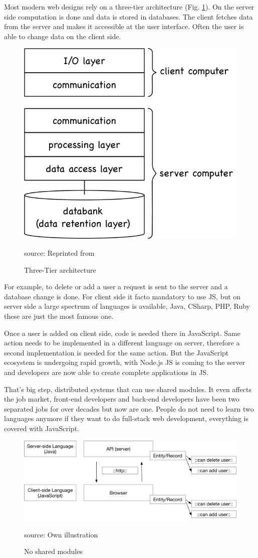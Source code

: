 Most modern web designs rely on a three-tier architecture (Fig. 
\ref{fig:TT}). On the server side computation is done and data 
is stored in databases. The client fetches data from the server and 
makes it accessible at the user interface. Often the user is able 
to change data on the client side. \cite{GOLL}

\begin{figure}[H]
	\centering
	\includegraphics[width=0.5\linewidth]{bilder/grundlagen/Three-Tier.png}
	\caption{Three-Tier architecture} source: Reprinted from \cite{GOLL}
	\label{fig:TT}
\end{figure}

For example, to delete or add a user a request is sent to the 
server and a database change is done. For client side it facto 
mandatory to use \gls{JS}, but on server side  a large spectrum of 
languages is available, Java, CSharp, PHP, Ruby these are just the 
most famous one.

Once a user is added on client side, code is needed there in JavaScript. Same action needs to be implemented in a different language on server, 
therefore a second implementation is needed for the same action.
But the JavaScript ecosystem is undergoing rapid growth, with Node.js \gls{JS} is coming to the server and developers are now able to create complete applications in \gls{JS}.

That's big step, distributed systems that can use shared modules. It even affects the job market, front-end developers and back-end developers have been two separated jobs for over decades but now are one. People do not need to learn two languages anymore if they want to do full-stack web development, everything is covered with JavaScript.

\begin{figure}[H]
	\centering
	\includegraphics[width=0.8\linewidth]{bilder/grundlagen/Entity1.png}
	\caption{No shared modules} source: Own illustration
	\label{fig:DS1}
\end{figure}

